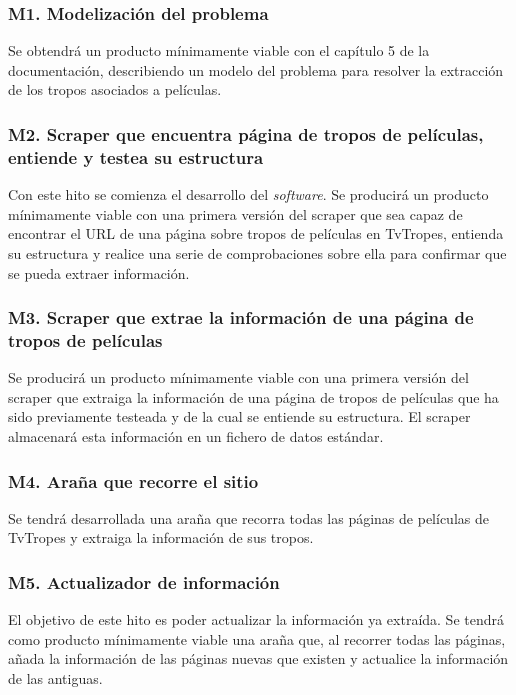 \subsubsection{M1. Modelización del problema}
Se obtendrá un producto mínimamente viable con el capítulo 5 de la documentación, describiendo un modelo del problema para resolver la extracción de los tropos asociados a películas.


\subsubsection{M2. Scraper que encuentra página de tropos de películas, entiende y testea su estructura}
Con este hito se comienza el desarrollo del \textit{software}. Se producirá un producto mínimamente viable con una primera versión del scraper que sea capaz de encontrar el URL de una página sobre tropos de películas en TvTropes, entienda su estructura y realice una serie de comprobaciones sobre ella para confirmar que se pueda extraer información.

\subsubsection{M3. Scraper que extrae la información de una página de tropos de películas}
Se producirá un producto mínimamente viable con una primera versión del scraper que extraiga la información de una página de tropos de películas que ha sido previamente testeada y de la cual se entiende su estructura. El scraper almacenará esta información en un fichero de datos estándar.


\subsubsection{M4. Araña que recorre el sitio}
Se tendrá desarrollada una araña que recorra todas las páginas de películas de TvTropes y extraiga la información de sus tropos.

\subsubsection{M5. Actualizador de información}
El objetivo de este hito es poder actualizar la información ya extraída. Se tendrá como producto mínimamente viable una araña que, al recorrer todas las páginas, añada la información de las páginas nuevas que existen y actualice la información de las antiguas.

